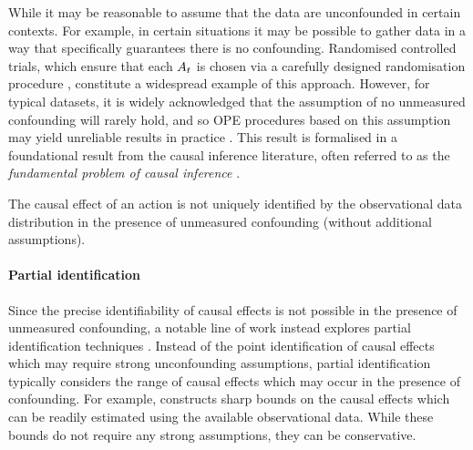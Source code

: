 While it may be reasonable to assume that the data are unconfounded in certain contexts. For example, in certain situations it may be possible to gather data in a way that specifically guarantees there is no confounding.
Randomised controlled trials, which ensure that each $A_t$ is chosen via a carefully designed randomisation procedure \citep{lavori2004dynamic,murphy2005experimental}, constitute a widespread example of this approach. However, for typical datasets, it is widely acknowledged that the assumption of no unmeasured confounding will rarely hold, and so OPE procedures based on this assumption may yield unreliable results in practice \citep{murphy2003optimal,tsiatis2019dynamic}. 
This result is formalised in a foundational result from the causal inference literature, often referred to as the \emph{fundamental problem of causal inference} \citep{holland1986statistics}.
\begin{mainresultwithtitle}[title=Fundamental problem of causal inference (informal statement)]\noindent
    The causal effect of an action is not uniquely identified by the observational data distribution in the presence of unmeasured confounding (without additional assumptions).
\end{mainresultwithtitle}


\paragraph{Partial identification}
Since the precise identifiability of causal effects is not possible in the presence of unmeasured confounding, a notable line of work instead explores partial identification techniques \citep{manski,manski1989anatomy, manski2003partial}. Instead of the point identification of causal effects which may require strong unconfounding assumptions, partial identification typically considers the range of causal effects which may occur in the presence of confounding. For example, \cite{manski} constructs sharp bounds on the causal effects which can be readily estimated using the available observational data. While these bounds do not require any strong assumptions, they can be conservative. 

